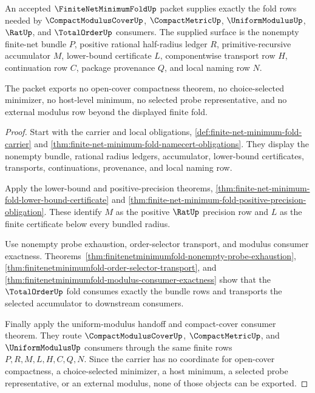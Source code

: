 \begin{theorem}
\label{thm:finitenetminimumfold-compact-cover-consumer-completeness}
An accepted $\FiniteNetMinimumFoldUp$ packet supplies exactly the fold rows needed by $\CompactModulusCoverUp$, $\CompactMetricUp$, $\UniformModulusUp$, $\RatUp$, and $\TotalOrderUp$ consumers. The supplied surface is the nonempty finite-net bundle $P$, positive rational half-radius ledger $R$, primitive-recursive accumulator $M$, lower-bound certificate $L$, componentwise transport row $H$, continuation row $C$, package provenance $Q$, and local naming row $N$.

The packet exports no open-cover compactness theorem, no choice-selected minimizer, no host-level minimum, no selected probe representative, and no external modulus row beyond the displayed finite fold.
\end{theorem}
\begin{proof}
Start with the carrier and local obligations, \autoref{def:finite-net-minimum-fold-carrier} and \autoref{thm:finite-net-minimum-fold-namecert-obligations}. They display the nonempty bundle, rational radius ledgers, accumulator, lower-bound certificates, transports, continuations, provenance, and local naming row.

Apply the lower-bound and positive-precision theorems, \autoref{thm:finite-net-minimum-fold-lower-bound-certificate} and \autoref{thm:finite-net-minimum-fold-positive-precision-obligation}. These identify $M$ as the positive $\RatUp$ precision row and $L$ as the finite certificate below every bundled radius.

Use nonempty probe exhaustion, order-selector transport, and modulus consumer exactness. Theorems~\ref{thm:finitenetminimumfold-nonempty-probe-exhaustion}, \ref{thm:finitenetminimumfold-order-selector-transport}, and \ref{thm:finitenetminimumfold-modulus-consumer-exactness} show that the $\TotalOrderUp$ fold consumes exactly the bundle rows and transports the selected accumulator to downstream consumers.

Finally apply the uniform-modulus handoff and compact-cover consumer theorem. They route $\CompactModulusCoverUp$, $\CompactMetricUp$, and $\UniformModulusUp$ consumers through the same finite rows $P,R,M,L,H,C,Q,N$. Since the carrier has no coordinate for open-cover compactness, a choice-selected minimizer, a host minimum, a selected probe representative, or an external modulus, none of those objects can be exported.
\end{proof}

